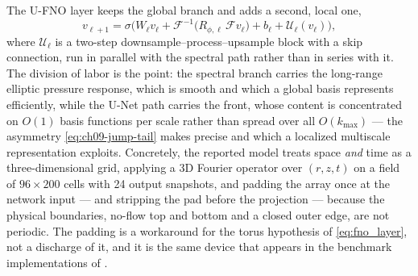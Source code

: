 The U-FNO layer keeps the global branch and adds a second, local one,
\begin{equation}
  v_{\ell+1} = \sigma\Big( W_\ell v_\ell + \mathcal{F}^{-1}\!\big(R_{\phi,\ell}\,\mathcal{F}v_\ell\big) + b_\ell + \mathcal{U}_\ell(v_\ell) \Big),
  \label{eq:ch34-layer}
\end{equation}
where $\mathcal{U}_\ell$ is a two-step downsample--process--upsample block with a
skip connection, run in parallel with the spectral path rather than in series with
it. The division of labor is the point: the spectral branch carries the long-range
elliptic pressure response, which is smooth and which a global basis represents
efficiently, while the U-Net path carries the front, whose content is concentrated
on $O(1)$ basis functions per scale rather than spread over all
$O(k_{\max})$ --- the asymmetry \eqref{eq:ch09-jump-tail} makes precise and which a
localized multiscale representation exploits. Concretely, the reported model treats
space \emph{and} time as a three-dimensional grid, applying a 3D Fourier operator
over $(r, z, t)$ on a field of $96 \times 200$ cells with 24 output snapshots, and
padding the array once at the network input --- and stripping the pad before the
projection --- because the physical boundaries, no-flow top and bottom and a closed
outer edge, are not periodic. The padding is a workaround
for the torus hypothesis of \eqref{eq:fno_layer}, not a discharge of it, and it is
the same device that appears in the benchmark implementations of
.

